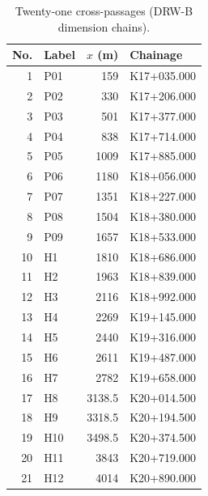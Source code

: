 \begin{table}[ht]
\centering
\caption{Twenty-one cross-passages (DRW-B dimension chains).}
\label{tab:passages21}
\begin{tabular}{rlrl}
\toprule
No. & Label & $x$ (m) & Chainage \\
\midrule
1 & P01 & 159 & K17+035.000 \\
2 & P02 & 330 & K17+206.000 \\
3 & P03 & 501 & K17+377.000 \\
4 & P04 & 838 & K17+714.000 \\
5 & P05 & 1009 & K17+885.000 \\
6 & P06 & 1180 & K18+056.000 \\
7 & P07 & 1351 & K18+227.000 \\
8 & P08 & 1504 & K18+380.000 \\
9 & P09 & 1657 & K18+533.000 \\
10 & H1 & 1810 & K18+686.000 \\
11 & H2 & 1963 & K18+839.000 \\
12 & H3 & 2116 & K18+992.000 \\
13 & H4 & 2269 & K19+145.000 \\
14 & H5 & 2440 & K19+316.000 \\
15 & H6 & 2611 & K19+487.000 \\
16 & H7 & 2782 & K19+658.000 \\
17 & H8 & 3138.5 & K20+014.500 \\
18 & H9 & 3318.5 & K20+194.500 \\
19 & H10 & 3498.5 & K20+374.500 \\
20 & H11 & 3843 & K20+719.000 \\
21 & H12 & 4014 & K20+890.000 \\
\bottomrule
\end{tabular}
\end{table}
